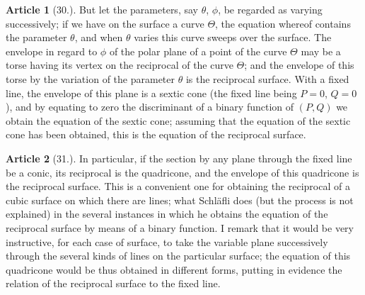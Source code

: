 \documentclass[11pt,a4paper]{article}
\theoremstyle{definition}
\newtheorem{art}{Article}
\begin{document}
\begin{art}[30.]
But let the parameters, say $\theta$, $\phi$, be regarded as varying successively; if we have on the surface a curve $\Theta$, the equation whereof contains the parameter $\theta$, and when $\theta$ varies this curve sweeps over the surface. The envelope in regard to $\phi$ of the polar plane of a point of the curve $\Theta$ may be a torse having its vertex on the reciprocal of the curve $\Theta$; and the envelope of this torse by the variation of the parameter $\theta$ is the reciprocal surface. With a fixed line, the envelope of this plane is a sextic cone (the fixed line being $P = 0$, $Q = 0$), and by equating to zero the discriminant of a binary function of $(P, Q)$ we obtain the equation of the sextic cone; assuming that the equation of the sextic cone has been obtained, this is the equation of the reciprocal surface.
\end{art}

\begin{art}[31.]
In particular, if the section by any plane through the fixed line be a conic, its reciprocal is the quadricone, and the envelope of this quadricone is the reciprocal surface. This is a convenient one for obtaining the reciprocal of a cubic surface on which there are lines; what Schl\"afli does (but the process is not explained) in the several instances in which he obtains the equation of the reciprocal surface by means of a binary function. I remark that it would be very instructive, for each case of surface, to take the variable plane successively through the several kinds of lines on the particular surface; the equation of this quadricone would be thus obtained in different forms, putting in evidence the relation of the reciprocal surface to the fixed line.
\end{art}
\end{document}

